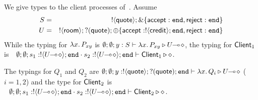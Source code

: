 \begin{example}\label{exam:type}
We give types to the client
processes of~.
Assume 
\begin{eqnarray*}
S & = & \btout{\Quote} \btbra{\accept: \tinact, \reject: \tinact} \\
U & = & \btout{\rtype} \btinp{\Quote} \btsel{\accept: \btout{\creditc} \tinact, \reject: \tinact }
\end{eqnarray*}
While the typing for $\abs{x}{P_{xy}}$ is $\es; \es; y: S \proves \abs{x}{P_{xy}} \hastype \lhot{U}$,
the typing for $\Client_1$ is
$~~
	\es; \es; s_1: \btout{\lhot{U}} \tinact \cat s_2: \btout{\lhot{U}} \tinact \proves \Client_1 \hastype \Proc
$.


The typings for $Q_1$ and $Q_2$ are
$	\es; \es; y: \btout{\Quote} \btinp{\Quote} \tinact \proves \abs{x}{Q_i} \hastype \lhot{U}
$ ($i=1,2$)
and the type for $\Client_2$ is
$~~
	\es; \es; s_1: \btout{\lhot{U}} \tinact \cat s_2: \btout{\lhot{U}} \tinact \proves \Client_2 \hastype \Proc
$.
\end{example}

